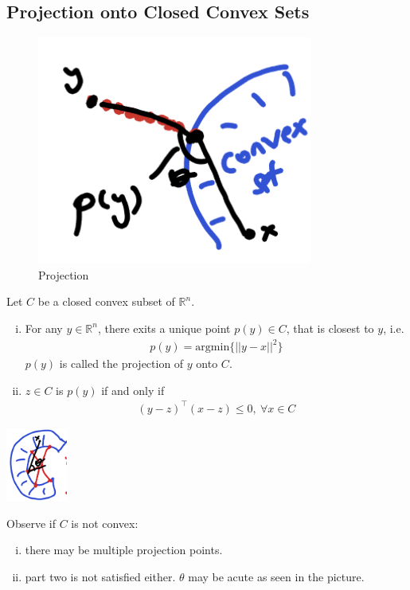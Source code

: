 \documentclass[11pt]{article}
\numberwithin{equation}{section}
\begin{document}
\subsection{Projection onto Closed Convex Sets}
\begin{figure}[h]
    \centering
    \includegraphics[scale = 0.9]{images/3-ex-1.png}
    \caption{Projection}
\end{figure}

\begin{theorem}\label{thm:project}
    Let $C$ be a closed convex subset of $\mathbb{R}^n$.
    \begin{enumerate}[(i)]
        \item For any $y \in \mathbb{R}^n$, there exits a unique point $p(y) \in C$, that is closest to $y$, i.e. \begin{align*}
            p(y)=\mathrm{argmin}\{||y-x||^2\}
        \end{align*}
        $p(y)$ is called the projection of $y$ onto $C$.
        \item $z \in C$ is $p(y)$ if and only if \begin{align*}
            (y-z)^\top (x - z)\leq 0, \ \forall x \in C
        \end{align*}
    \end{enumerate}
\end{theorem}

\begin{example}
    \begin{minipage}[b]{0.3\linewidth}
        \centering
        \includegraphics[width = 2cm]{images/3-th-1.png}
    \end{minipage}
    \begin{minipage}[b]{0.65\linewidth}
        Observe if $C$ is not convex: 
        \begin{enumerate}[i)]
            \item there may be multiple projection points.
            \item part two is not satisfied either. $\theta$ may be acute as seen in the picture.
        \end{enumerate}            
    \end{minipage}
\end{example}
\end{document}

